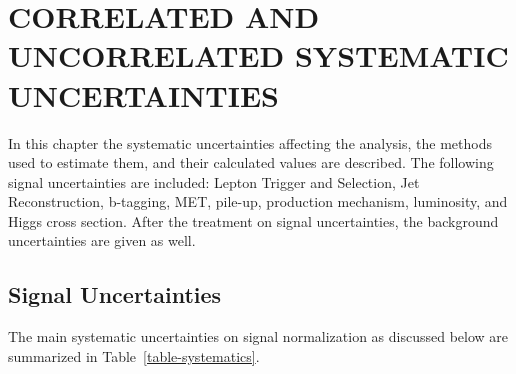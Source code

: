 

\chapter{CORRELATED AND UNCORRELATED SYSTEMATIC UNCERTAINTIES}
\label{sec:systematics}


In this chapter the systematic uncertainties affecting the analysis, the methods used to estimate them, and their calculated values are described. The following signal uncertainties are included: Lepton Trigger and Selection, Jet Reconstruction, b-tagging, MET, pile-up, production mechanism, luminosity, and Higgs cross section.  After the treatment on signal uncertainties, the background uncertainties are given as well.




\section{Signal Uncertainties}
The main systematic uncertainties on signal normalization as discussed below are summarized in Table~\ref{table-systematics}.

